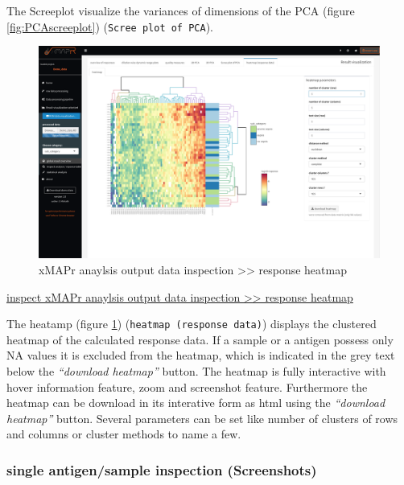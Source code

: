 \documentclass[
]{book}
\begin{document}
The Screeplot visualize the variances of dimensions of the PCA (figure \ref{fig:PCAscreeplot}) (\texttt{Scree\ plot\ of\ PCA}).

\begin{figure}
\includegraphics[width=50.47in]{figures/response_heatmap} \caption{xMAPr anaylsis output data inspection >> response heatmap}\label{fig:responseHeatmap}
\end{figure}

\href{figures/response_heatmap.png}{inspect xMAPr anaylsis output data inspection \textgreater\textgreater{} response heatmap}

The heatamp (figure \ref{fig:responseHeatmap}) (\texttt{heatmap\ (response\ data)}) displays the clustered heatmap of the calculated response data. If a sample or a antigen possess only NA values it is excluded from the heatmap, which is indicated in the grey text below the \emph{``download heatmap''} button. The heatmap is fully interactive with hover information feature, zoom and screenshot feature. Furthermore the heatmap can be download in its interative form as html using the \emph{``download heatmap''} button. Several parameters can be set like number of clusters of rows and columns or cluster methods to name a few.

\hypertarget{single-antigensample-inspection-screenshots}{%
\subsubsection{single antigen/sample inspection (Screenshots)}\label{single-antigensample-inspection-screenshots}}
\end{document}
